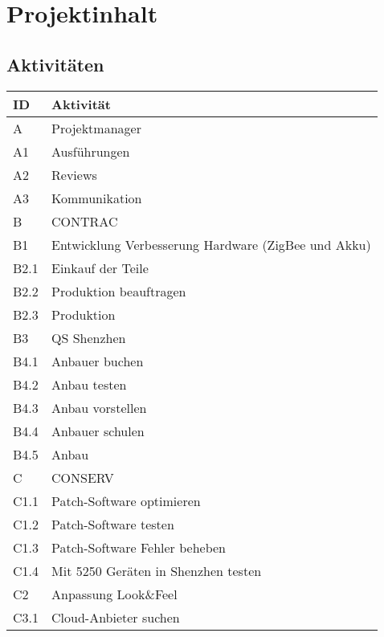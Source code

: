 \section{Projektinhalt}
\subsection{Aktivitäten}
\begin{table}[H]
    \renewcommand{\arraystretch}{1.05}
    \begin{center}
        \begin{tabular}{l|l}
            \hline
            \textbf{ID} & \textbf{Aktivität}\\\hline
            A    & Projektmanager\\ \hline
            A1   & Ausführungen\\ \hline
            A2   & Reviews\\ \hline
            A3 & Kommunikation \\\hline
            B    & CONTRAC\\ \hline
            B1   & Entwicklung Verbesserung Hardware (ZigBee und Akku) \\ \hline
            B2.1 & Einkauf der Teile\\\hline
            B2.2 & Produktion beauftragen\\ \hline
            B2.3 & Produktion\\ \hline
            B3 & QS Shenzhen\\ \hline
            B4.1 & Anbauer buchen\\ \hline
            B4.2 & Anbau testen\\ \hline
            B4.3 & Anbau vorstellen\\ \hline
            B4.4 & Anbauer schulen\\ \hline
            B4.5 & Anbau\\ \hline
            C    & CONSERV\\ \hline
            C1.1 & Patch-Software optimieren\\ \hline
            C1.2 & Patch-Software testen \\ \hline
            C1.3 & Patch-Software Fehler beheben\\ \hline
            C1.4   & Mit 5250 Geräten in Shenzhen testen\\ \hline
            C2 & Anpassung Look\&Feel\\\hline
            C3.1 & Cloud-Anbieter suchen \\ \hline

\end{tabular}
\end{center}
\end{table}

